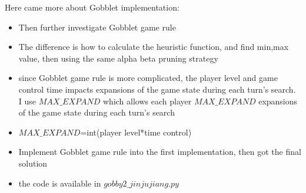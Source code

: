 \documentclass{article}
\begin{document}
\begin{enumerate}
Here came more about Gobblet implementation:\\

\begin{itemize}
\item Then further investigate Gobblet game rule
\item The difference is how to calculate the heuristic function, and find min,max value, then using the same alpha beta pruning strategy
\item since Gobblet game rule is more complicated, the player level and game control time impacts expansions of the	game state during each turn's search. I use $MAX\_EXPAND$ which allows each player $MAX\_EXPAND$ expansions of the game state during each turn's search
\item $MAX\_EXPAND$=int(player level*time control)
\item Implement Gobblet game rule into the first implementation, then got the final solution
\item the code is available in $gobby2\_jinjujiang.py$
\end{itemize}

\end{enumerate}
\end{document}

